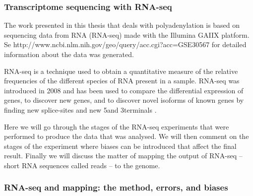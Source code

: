 %
\subsubsection{Transcriptome sequencing with RNA-seq}
The work presented in this thesis that deals with polyadenylation is based on
sequencing data from RNA (RNA-seq) made with the Illumina GAIIX platform. Se
http://www.ncbi.nlm.nih.gov/geo/query/acc.cgi?acc=GSE30567 for detailed
information about the data was generated.

RNA-seq is a technique used to obtain a quantitative measure of the relative
frequencies of the different species of RNA present in a sample. RNA-seq was
introduced in 2008 and has been used to compare the differential expression of
genes, to discover new genes, and to discover novel isoforms of known genes by
finding new splice-sites and new 5\p and 3\p terminals
\cite{wang_rna-seq:_2009}.

Here we will go through the stages of the RNA-seq experiments that were
performed to produce the data that was analysed. We will then comment on the
stages of the experiment where biases can be introduced that affect the final
result. Finally we will discuss the matter of mapping the output of RNA-seq --
short RNA sequences called reads -- to the genome.

\subsubsection{RNA-seq and mapping: the method, errors, and biases}

